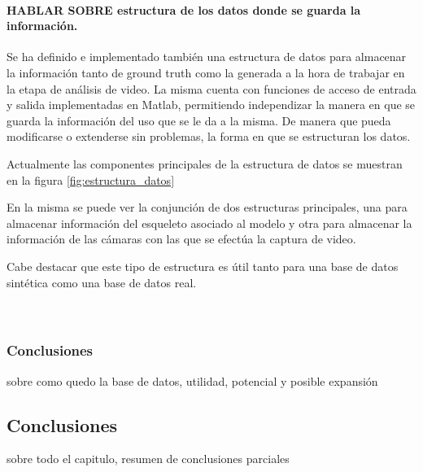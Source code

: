 \paragraph{HABLAR SOBRE estructura de los datos donde se guarda la información.}
Se ha definido e implementado también una estructura de datos para almacenar la información tanto de ground truth como la generada a la hora de  trabajar en la etapa de análisis de video. La misma cuenta con funciones de acceso de entrada y salida implementadas en Matlab, permitiendo independizar la manera en que se guarda la información del uso que se le da a la misma. De manera que pueda modificarse o extenderse sin problemas, la forma en que se estructuran los datos.

Actualmente las componentes principales de la estructura de datos se muestran en la figura \ref{fig:estructura_datos}

En la misma se puede ver la conjunción de dos estructuras principales, una para almacenar información del esqueleto asociado al modelo y otra para almacenar la información de las cámaras con las que se efectúa la captura de video.

Cabe destacar que este tipo de estructura es útil tanto para una base de datos sintética como una base de datos real. \\
\\
\\
\subsubsection{Conclusiones}
sobre como quedo la base de datos, utilidad, potencial y posible expansión

\subsection{Conclusiones}
sobre todo el capitulo, resumen de conclusiones parciales



